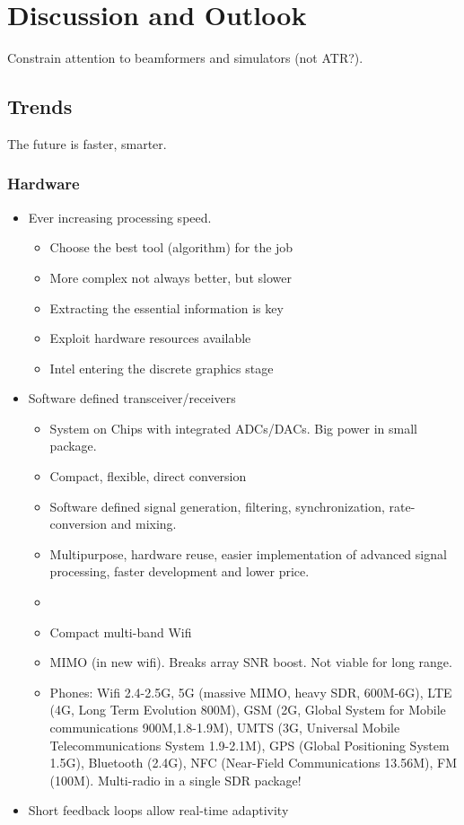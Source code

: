
\endofdump

\ifRootBuild\else
  
  \makeglossaries
\fi



\chapter{Discussion and Outlook}

Constrain attention to beamformers and simulators (not ATR?).

\section{Trends}

The future is faster, smarter.

\subsection{Hardware}

\begin{itemize}
\item Ever increasing processing speed.
\begin{itemize}
	\item Choose the best tool (algorithm) for the job
	\item More complex not always better, but slower
	\item Extracting the essential information is key 
	\item Exploit hardware resources available
   \item Intel entering the discrete graphics stage
   \end{itemize}
\item Software defined transceiver/receivers
\begin{itemize}
\item System on Chips with integrated ADCs/DACs. Big power in small package.
\item Compact, flexible, direct conversion
\item Software defined signal generation, filtering, synchronization, rate-conversion and mixing.
\item Multipurpose, hardware reuse, easier implementation of advanced signal processing, faster development and lower price.
\item 
\item Compact multi-band Wifi
\item MIMO (in new wifi). Breaks array SNR boost. Not viable for long range.
\item Phones: Wifi 2.4-2.5G, 5G (massive MIMO, heavy SDR, 600M-6G), LTE (4G, Long Term Evolution 800M), GSM (2G, Global System for Mobile communications 900M,1.8-1.9M), UMTS (3G, Universal Mobile Telecommunications System 1.9-2.1M), GPS (Global Positioning System 1.5G), Bluetooth (2.4G), NFC (Near-Field Communications 13.56M), FM (100M). Multi-radio in a single SDR package!
\end{itemize}
\item Short feedback loops allow real-time adaptivity
\end{itemize}


